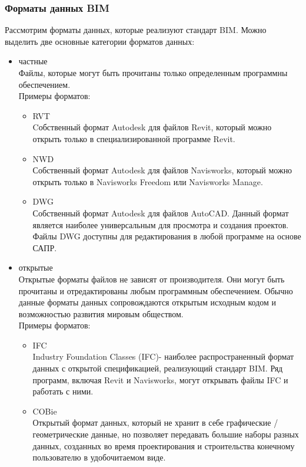 \documentclass[a4paper,14pt]{extreport} %
\begin{document}
\subsubsection{Форматы данных BIM}
Рассмотрим форматы данных, которые реализуют стандарт BIM.
Можно выделить две основные категории форматов данных:
\begin{itemize}
\item частные \\
Файлы, которые могут быть прочитаны только определенным программны обеспечением. \\
Примеры форматов:
	\begin{itemize}
	\item RVT \\
	Cобственный формат Autodesk для файлов Revit, который можно открыть только в специализированной программе Revit.
	\item NWD \\
	Собственный формат Autodesk для файлов Navisworks, который можно открыть только в Navisworks Freedom или Navisworks Manage.
	\item DWG \\
	Собственный формат Autodesk для файлов AutoCAD. Данный формат является наиболее универсальным для просмотра и создания проектов. Файлы DWG доступны для редактирования в любой программе на основе САПР.
	\end{itemize}
\item открытые \\
Открытые форматы файлов не зависят от производителя. Они могут быть прочитаны и отредактированы любым программным обеспечением. Обычно данные форматы данных сопровождаются открытым исходным кодом и возможностью развития мировым обществом. \\
Примеры форматов:
	\begin{itemize}
	\item IFC \\
	Industry Foundation Classes (IFC)- наиболее распространенный формат данных с открытой спецификацией, реализующий стандарт BIM. Ряд программ, включая Revit и Navisworks, могут открывать файлы IFC и работать с ними.
	\item COBie \\
	Открытый формат данных, который не хранит в себе графические / геометрические данные, но позволяет передавать большие наборы разных данных, созданных во время проектирования и строительства конечному пользователю в удобочитаемом виде.
	\end{itemize}
\end{itemize}
\end{document}
